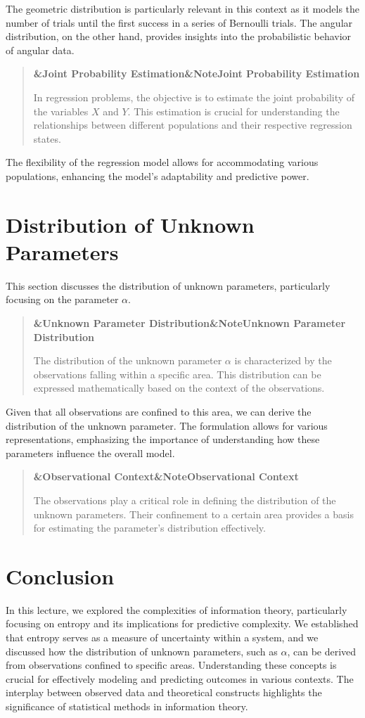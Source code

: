 \documentclass[a4paper]{article}
\newcommand{\boxheading}[1]{%
  \par\smallskip
  \noindent\textbf{\ifx&#1&Note\else#1\fi}\par
  \smallskip
}
\newenvironment{defbox}[1][]{%
  \begin{quote}\color{green!40!black}\boxheading{#1}\normalcolor
}{\end{quote}}
\newenvironment{rembox}[1][]{%
  \begin{quote}\color{black!70}\boxheading{#1}\normalcolor
}{\end{quote}}
\begin{document}
The geometric distribution is particularly relevant in this context as it models the number of trials until the first success in a series of Bernoulli trials. The angular distribution, on the other hand, provides insights into the probabilistic behavior of angular data.

\begin{rembox}[Joint Probability Estimation]
In regression problems, the objective is to estimate the joint probability of the variables \( X \) and \( Y \). This estimation is crucial for understanding the relationships between different populations and their respective regression states.
\end{rembox}

The flexibility of the regression model allows for accommodating various populations, enhancing the model's adaptability and predictive power.

\section{Distribution of Unknown Parameters}
This section discusses the distribution of unknown parameters, particularly focusing on the parameter \(\alpha\).

\begin{defbox}[Unknown Parameter Distribution]
The distribution of the unknown parameter \(\alpha\) is characterized by the observations falling within a specific area. This distribution can be expressed mathematically based on the context of the observations.
\end{defbox}

Given that all observations are confined to this area, we can derive the distribution of the unknown parameter. The formulation allows for various representations, emphasizing the importance of understanding how these parameters influence the overall model.

\begin{rembox}[Observational Context]
The observations play a critical role in defining the distribution of the unknown parameters. Their confinement to a certain area provides a basis for estimating the parameter's distribution effectively.
\end{rembox}

\section{Conclusion}
In this lecture, we explored the complexities of information theory, particularly focusing on entropy and its implications for predictive complexity. We established that entropy serves as a measure of uncertainty within a system, and we discussed how the distribution of unknown parameters, such as \(\alpha\), can be derived from observations confined to specific areas. Understanding these concepts is crucial for effectively modeling and predicting outcomes in various contexts. The interplay between observed data and theoretical constructs highlights the significance of statistical methods in information theory.
\end{document}
